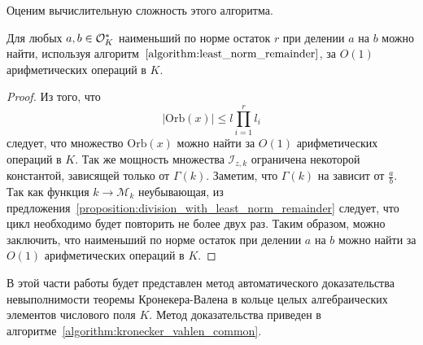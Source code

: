 \documentclass[_00_dissertation.tex]{subfiles}
\begin{document}
Оценим вычислительную сложность этого алгоритма.

\begin{proposition}
    Для любых $a, b \in \mathcal{O}_K^{*}$ наименьший по норме остаток $r$ при делении $a$ на $b$ можно найти, используя алгоритм~$\ref{algorithm:least_norm_remainder}$, за $O(1)$ арифметических операций в $K$.
\end{proposition}
\begin{proof}
    Из того, что
    \begin{equation*}
        |\textrm{Orb}(x)| \le l\prod\limits_{i=1}^r l_i
    \end{equation*}
    следует, что множество $\textrm{Orb}(x)$ можно найти за $O(1)$ арифметических операций в $K$.
    Так же мощность множества $\mathcal{I}_{z, k}$ ограничена некоторой константой, зависящей только от $\Gamma(k)$.
    Заметим, что $\Gamma(k)$ на зависит от $\frac{a}{b}$.
    Так как функция $k \to \mathcal{M}_k$ неубывающая, из предложения~\ref{proposition:division_with_least_norm_remainder} следует, что цикл необходимо будет повторить не более двух раз.
    Таким образом, можно заключить, что наименьший по норме остаток при делении $a$ на $b$ можно найти за $O(1)$ арифметических операций в $K$.
\end{proof}


В этой части работы будет представлен метод автоматического доказательства невыполнимости теоремы Кронекера-Валена в кольце целых алгебраических элементов числового поля $K$.
Метод доказательства приведен в алгоритме~\ref{algorithm:kronecker_vahlen_common}.
\end{document}

